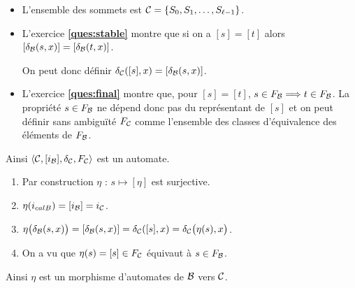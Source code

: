 \begin{Exercise}[label=ques:coprod1]

\begin{itemize}
\item L'ensemble des sommets est ${\cal C} = \{S_0, S_1, \ldots, S_{\ell - 1}\}$.

\item L'exercice {\bf\ref{ques:stable}} montre que si on a $[s] = [t]$ alors $[\delta_{\cal B}(s, x)] = [\delta_{\cal B}(t, x)]$. 

On peut donc définir $\delta_{\cal C}([s], x) =[\delta_{\cal B}(s, x)]$. 

\item L'exercice {\bf\ref{ques:final}} montre que, pour $[s] = [t]$, $s\in F_{\cal B}\Longrightarrow t\in F_{\cal B}$. La propriété $s\in F_{\cal B}$ ne dépend donc pas du représentant de $[s]$ et on peut définir sans ambiguïté $F_{\cal C}$ comme l'ensemble des classes d'équivalence des éléments de $F_{\cal B}$.
\end{itemize}
Ainsi $\langle {\cal C}, [i_{\cal B}], \delta_{\cal C}, F_{\cal C}\rangle$ est un automate.

\begin{enumerate}
\item Par construction $\eta$ : $s \mapsto [\eta]$ est surjective.
\item $\eta(i_{cal B}) = [i_{\cal B}] = i_{\cal C}$.
\item $\eta\bigl(\delta_{\cal B}(s, x)\bigr) = [\delta_{\cal B}(s, x)] = \delta_{\cal C}([s], x)=\delta_{\cal C}\bigl(\eta(s), x\bigr)$.
\item On a vu que $\eta(s) = [s] \in F_{\cal C}$ équivaut à $s \in  F_{\cal B}$. 
\end{enumerate}

Ainsi $\eta$ est un morphisme d'automates de ${\cal B}$ vers ${\cal C}$.
\end{Exercise}
